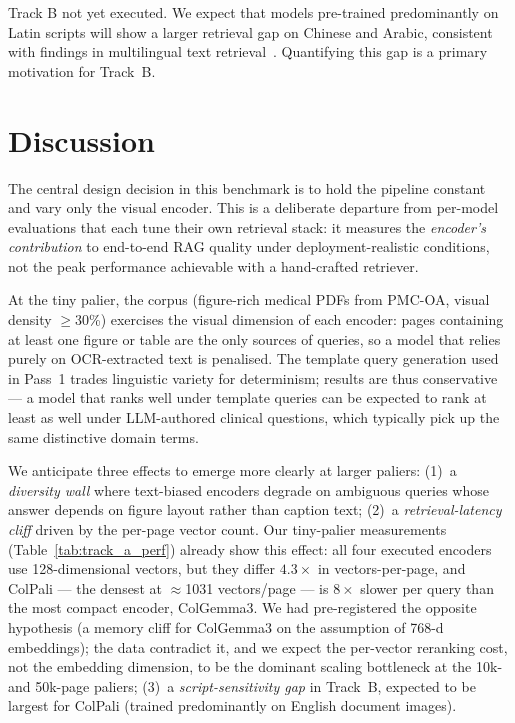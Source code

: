 \documentclass[10pt,a4paper]{article}
\begin{document}
Track B not yet executed. We expect that models pre-trained predominantly
on Latin scripts will show a larger retrieval gap on Chinese and Arabic,
consistent with findings in multilingual text retrieval~\cite{muennighoff2023mteb}.
Quantifying this gap is a primary motivation for Track~B.

\section{Discussion}
\label{sec:discussion}

The central design decision in this benchmark is to hold the pipeline
constant and vary only the visual encoder. This is a deliberate departure
from per-model evaluations that each tune their own retrieval stack: it
measures the \emph{encoder's contribution} to end-to-end RAG quality under
deployment-realistic conditions, not the peak performance achievable with
a hand-crafted retriever.

At the tiny palier, the corpus (figure-rich medical PDFs from PMC-OA,
visual density $\geq$30\%) exercises the visual dimension of each encoder:
pages containing at least one figure or table are the only sources of
queries, so a model that relies purely on OCR-extracted text is penalised.
The template query generation used in Pass~1 trades linguistic variety
for determinism; results are thus conservative --- a model that ranks well
under template queries can be expected to rank at least as well under
LLM-authored clinical questions, which typically pick up the same
distinctive domain terms.

We anticipate three effects to emerge more clearly at larger paliers:
(1)~a \emph{diversity wall} where text-biased encoders degrade on
ambiguous queries whose answer depends on figure layout rather than
caption text;
(2)~a \emph{retrieval-latency cliff} driven by the per-page vector count.
Our tiny-palier measurements (Table~\ref{tab:track_a_perf}) already show this
effect: all four executed encoders use 128-dimensional vectors, but they
differ $4.3\times$ in vectors-per-page, and ColPali --- the densest at
$\approx$1031 vectors/page --- is $8\times$ slower per query than the most
compact encoder, ColGemma3. We had pre-registered the opposite hypothesis (a
memory cliff for ColGemma3 on the assumption of 768-d embeddings); the data
contradict it, and we expect the per-vector reranking cost, not the embedding
dimension, to be the dominant scaling bottleneck at the 10k- and 50k-page
paliers;
(3)~a \emph{script-sensitivity gap} in Track~B, expected to be largest for
ColPali (trained predominantly on English document images).
\end{document}
